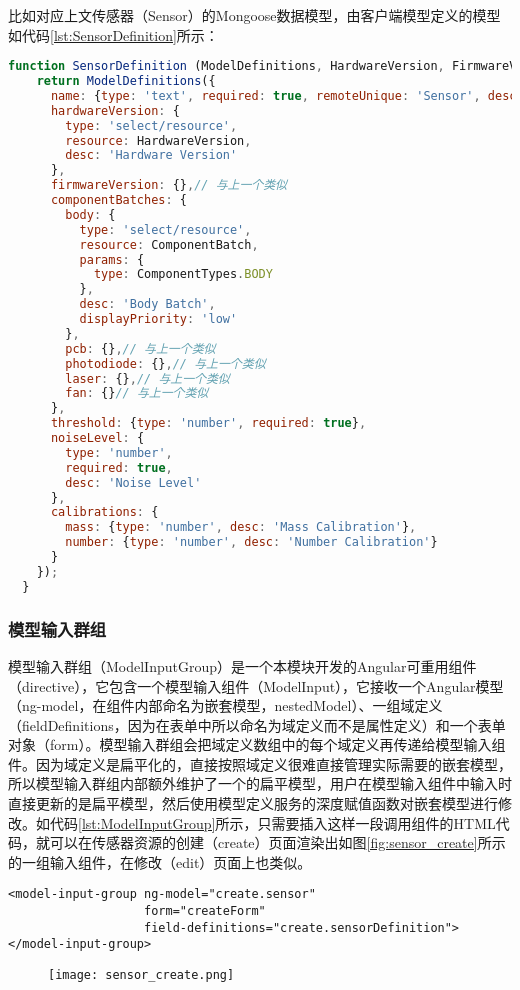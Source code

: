 比如对应上文传感器（Sensor）的Mongoose数据模型，由客户端模型定义的模型如代码\ref{lst:SensorDefinition}所示：
\begin{lstlisting}[language={JavaScript}, label={lst:SensorDefinition}, caption={Sensor的客户端模型}]
function SensorDefinition (ModelDefinitions, HardwareVersion, FirmwareVersion, ComponentBatch, ComponentTypes) {
    return ModelDefinitions({
      name: {type: 'text', required: true, remoteUnique: 'Sensor', desc: 'ID'},
      hardwareVersion: {
        type: 'select/resource',
        resource: HardwareVersion,
        desc: 'Hardware Version'
      },
      firmwareVersion: {},// 与上一个类似
      componentBatches: {
        body: {
          type: 'select/resource',
          resource: ComponentBatch,
          params: {
            type: ComponentTypes.BODY
          },
          desc: 'Body Batch',
          displayPriority: 'low'
        },
        pcb: {},// 与上一个类似
        photodiode: {},// 与上一个类似
        laser: {},// 与上一个类似
        fan: {}// 与上一个类似
      },
      threshold: {type: 'number', required: true},
      noiseLevel: {
        type: 'number',
        required: true,
        desc: 'Noise Level'
      },
      calibrations: {
        mass: {type: 'number', desc: 'Mass Calibration'},
        number: {type: 'number', desc: 'Number Calibration'}
      }
    });
  }
\end{lstlisting}

\subsubsection{模型输入群组}
模型输入群组（ModelInputGroup）是一个本模块开发的Angular可重用组件（directive），它包含一个模型输入组件（ModelInput），它接收一个Angular模型（ng-model，在组件内部命名为嵌套模型，nestedModel）、一组域定义（fieldDefinitions，因为在表单中所以命名为域定义而不是属性定义）和一个表单对象（form）。模型输入群组会把域定义数组中的每个域定义再传递给模型输入组件。因为域定义是扁平化的，直接按照域定义很难直接管理实际需要的嵌套模型，所以模型输入群组内部额外维护了一个的扁平模型，用户在模型输入组件中输入时直接更新的是扁平模型，然后使用模型定义服务的深度赋值函数对嵌套模型进行修改。如代码\ref{lst:ModelInputGroup}所示，只需要插入这样一段调用组件的HTML代码，就可以在传感器资源的创建（create）页面渲染出如图\ref{fig:sensor_create}所示的一组输入组件，在修改（edit）页面上也类似。
\begin{lstlisting}[language={HTML5}, label={lst:ModelInputGroup}, caption={传感器创建页面中的模型输入群组代码}]
<model-input-group ng-model="create.sensor"
                   form="createForm"
                   field-definitions="create.sensorDefinition">
</model-input-group>
\end{lstlisting}
\begin{figure}[H]
 \centering
 \texttt{[image: sensor\_create.png]}
\end{figure}
